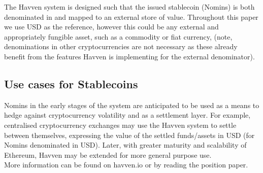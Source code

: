\noindent The Havven system is designed such that the issued stablecoin (Nomins) is both denominated in and
mapped to an external store of value. Throughout this paper we use USD as the reference, however this could
be any external and appropriately fungible asset, such as a commodity or fiat currency, (note, denominations
in other cryptocurrencies are not necessary as these already benefit from the features Havven is implementing
for the external denominator). \\

\subsection{Use cases for Stablecoins}

\noindent Nomins in the early stages of the system are anticipated to be used as a means to hedge against
cryptocurrency volatility and as a settlement layer. For example, centralised cryptocurrency exchanges may
use the Havven system to settle between themselves, expressing the value of the settled funds/assets in USD
(for Nomins denominated in USD). Later, with greater maturity and scalability of Ethereum, Havven may be
extended for more general purpose use. \\


\noindent More information can be found on havven.io or by reading the position paper.

\pagebreak
